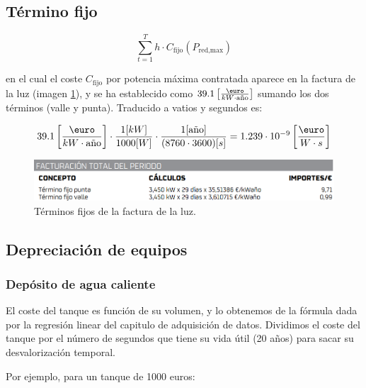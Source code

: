 \subsection{Término fijo}

\begin{equation}
	\sum_{t=1}^{T} h \cdot C_\text{fijo}(P_\text{red,max})
\end{equation}

en el cual el coste $C_{\text{fijo}}$ por potencia máxima contratada aparece en la factura de la
luz (imagen \ref{fig:fixed_energy_cost}), y se ha establecido como $39.1 \left[\frac{\text{\euro}}{kW\cdot \text{\text{año}}}\right]$
sumando los dos términos (valle y punta).
Traducido a vatios y segundos es:

\begin{equation}
	39.1 \left[\frac{\text{\euro}}{kW\cdot \text{año}}\right] \cdot \frac{1[kW]}{1000[W]} \cdot \frac{1[\text{año}]}{(8760 \cdot 3600)[s]} = 1.239 \cdot 10^{-9} \left[\frac{\text{\euro}}{W\cdot s}\right]
\end{equation}



\begin{figure}[h] \centering
	\centering
	\includegraphics[width=1\textwidth]{./capitulos/resultados_discusion/images/fixed_energy_cost.png}
	\caption{Términos fijos de la factura de la luz.}
	\label{fig:fixed_energy_cost}
\end{figure}


\subsection{Depreciación de equipos}

\subsubsection{Depósito de agua caliente}

El coste del tanque es función de su volumen, y lo obtenemos de la fórmula dada
por la regresión linear del capitulo de adquisición de datos. Dividimos el coste
del tanque por el número de segundos que tiene su vida útil (20 años) para
sacar su desvalorización temporal.

Por ejemplo, para un tanque de 1000 euros:

